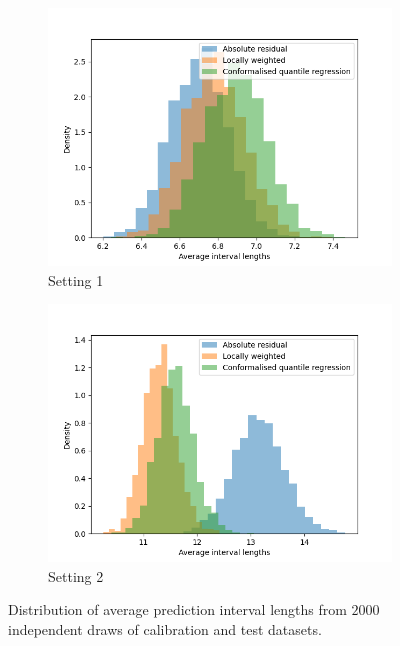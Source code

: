 \documentclass[11pt, titlepage]{article} %
\numberwithin{equation}{section}
\theoremstyle{definition}
\numberwithin{theorem}{section}
\numberwithin{lemma}{section}
\numberwithin{corollary}{section}
\numberwithin{proposition}{section}
\numberwithin{definition}{section}
\numberwithin{remark}{section}
\begin{document}
\begin{figure}[H]
    \vspace{-0.8cm}
    \centering
    \begin{subfigure}{0.47\textwidth}
        \includegraphics[width=\linewidth]{figures/2_4_lens_dist.png}    
        \caption{Setting 1} \label{fig:2_4_homoscedastic_lens_dist}
    \end{subfigure}
    \begin{subfigure}{0.47\textwidth}
        \includegraphics[width=\linewidth]{figures/2_4_heteroscedastic_lens_dist.png}    
        \caption{Setting 2} \label{fig:2_4_heteroscedastic_lens_dist}
    \end{subfigure}
    \caption{Distribution of average prediction interval lengths from \(2000\) independent draws of calibration and test datasets.}
\label{fig:2_4_lens_dists}
\end{figure}
\end{document}
